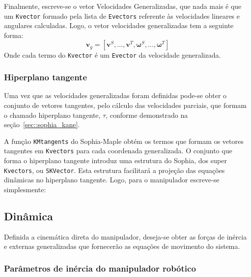 \bigskip {} \bigskip 

Finalmente, escreve-se o vetor Velocidades Generalizadas, que nada mais é
que um \texttt{Kvector} formado pela lista de \texttt{Evectors} referente às
velocidades lineares e angulares calculadas. Logo, o vetor velocidades
generalizadas tem a seguinte forma:
%
\begin{equation}
	\mathbf{v}_{g} = [ \mathbf{v}^{S},\ldots, \mathbf{v}^{T}, \boldsymbol{\omega}^{S},\ldots,
	\boldsymbol{\omega}^{T}]
\end{equation}
%
Onde cada termo do \texttt{Kvector} é um \texttt{Evector} da velocidade
generalizada.

\subsubsection{Hiperplano tangente}

Uma vez que as velocidades generalizadas foram definidas pode-se obter o
conjunto de vetores tangentes, pelo cálculo das velocidades parciais, que formam
o chamado hiperplano tangente, $\tau$, conforme demonstrado na
seção~\ref{sec::sophia_kane}.

A função \texttt{KMtangents} do Sophia-Maple obtém os termos que formam os
vetores tangentes em \texttt{Kvectors} para cada coordenada generalizada. O
conjunto que forma o hiperplano tangente introduz uma estrutura do Sophia, dos
super \texttt{Kvectors}, ou \texttt{SKVector}. Esta estrutura facilitará a
projeção das equações dinâmicas no hiperplano tangente. Logo, para o manipulador
escreve-se simplesmente:

\bigskip {} \bigskip


\subsection{Dinâmica}

Definida a cinemática direta do manipulador, deseja-se obter as forças de
inércia e externas generalizadas que fornecerão as equações de movimento do
sistema.

\subsubsection{Parâmetros de inércia do manipulador robótico}

